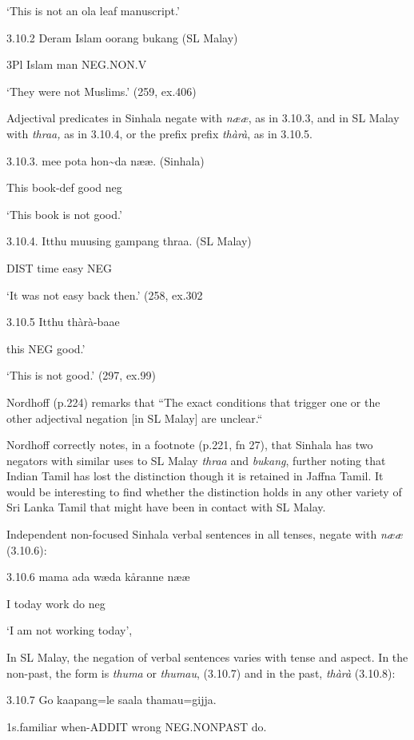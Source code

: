 \documentclass[letterpaper]{article}
\begin{document}
 `This is not an ola leaf manuscript.'

3.10.2 
\ea
\gll Deram Islam oorang bukang (SL Malay)

 3Pl Islam man NEG.NON.V

 `They were not Muslims.' (259, ex.406)

 Adjectival predicates in Sinhala negate with \textit{n{\ae}{\ae}}, as in 3.10.3, and in SL Malay with \textit{thraa,} as in 3.10.4, or the prefix prefix \textit{thàrà}, as in 3.10.5. 

 3.10.3. 
\ea
\gll mee  pota  hon{\~{}}da n{\ae}{\ae}. (Sinhala)

 This book-def  good  neg

 `This book is not good.' 

3.10.4. 
\ea
\gll Itthu muusing gampang thraa. (SL Malay)

 DIST time easy NEG

 `It was not easy back then.' (258, ex.302

3.10.5  
\ea
\gll Itthu thàrà-baae

 this NEG good.' 

 `This is not good.'  (297, ex.99)

 Nordhoff (p.224) remarks that ``The exact conditions that trigger one or the other adjectival negation [in SL Malay] are unclear.``

 Nordhoff correctly notes, in a footnote (p.221, fn 27), that Sinhala has two negators with similar uses to SL Malay \textit{thraa} and \textit{bukang}, further noting that Indian Tamil has lost the distinction though it is retained in Jaffna Tamil. It would be interesting to find whether the distinction holds in any other variety of Sri Lanka Tamil that might have been in contact with SL Malay.

Independent non-focused Sinhala verbal sentences in all tenses, negate with \textit{n{\ae}{\ae}} (3.10.6): 

3.10.6   
\ea
\gll mama ada w{\ae}d{\dag}a k{\aa}ranne n{\ae}{\ae}

  I today work do neg

  `I am not working today',

 In SL Malay, the negation of verbal sentences varies with tense and aspect. In the non-past, the form is \textit{thuma} or \textit{thumau},  (3.10.7) and in the past, \textit{thàrà} (3.10.8):

3.10.7 
\ea
\gll Go kaapang=le saala thamau=gijja.

 1s.familiar when-ADDIT wrong NEG.NONPAST do.
\end{document}
